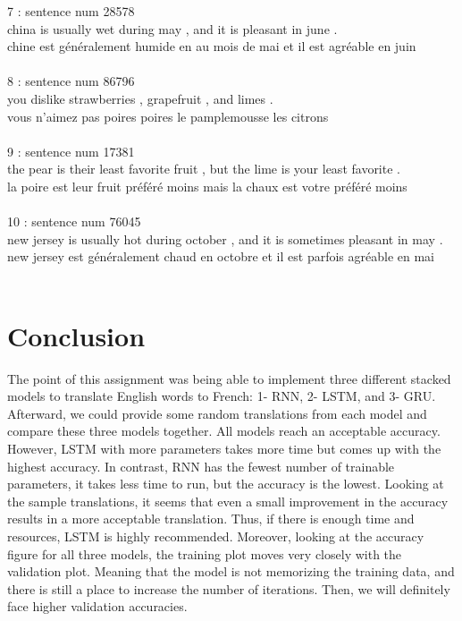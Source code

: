 \documentclass[12pt,oneside,geqno]{article}
\begin{document}
	7 : sentence num 28578\\
	china is usually wet during may , and it is pleasant in june .\\
	chine est généralement humide en au mois de mai et il est agréable en juin \\\\
	
	8 : sentence num 86796\\
	you dislike strawberries , grapefruit , and limes .\\
	vous n'aimez pas poires poires le pamplemousse les citrons \\\\
	
	9 : sentence num 17381\\
	the pear is their least favorite fruit , but the lime is your least favorite .\\
	la poire est leur fruit préféré moins mais la chaux est votre préféré moins \\\\
	
	10 : sentence num 76045\\
	new jersey is usually hot during october , and it is sometimes pleasant in may .\\
	new jersey est généralement chaud en octobre et il est parfois agréable en mai\\\\
	
	
	\section{Conclusion}
	The point of this assignment was being able to implement three different stacked models to translate English words to French: 1- RNN, 2- LSTM, and 3- GRU. Afterward, we could provide some random translations from each model and compare these three models together. All models reach an acceptable accuracy. However, LSTM with more parameters takes more time but comes up with the highest accuracy. In contrast, RNN has the fewest number of trainable parameters, it takes less time to run, but the accuracy is the lowest. Looking at the sample translations, it seems that even a small improvement in the accuracy results in a more acceptable translation. Thus, if there is enough time and resources, LSTM is highly recommended. Moreover, looking at the accuracy figure for all three models, the training plot moves very closely with the validation plot. Meaning that the model is not memorizing the training data, and there is still a place to increase the number of iterations. Then, we will definitely face higher validation accuracies.
	
	
\end{document}
